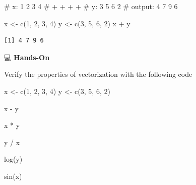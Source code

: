 \documentclass[
  letterpaper,
  DIV=11,
  numbers=noendperiod]{scrreprt}
\newenvironment{Shaded}{\begin{snugshade}}{\end{snugshade}}
\newcommand{\CommentTok}[1]{\textcolor[rgb]{0.37,0.37,0.37}{#1}}
\newcommand{\DecValTok}[1]{\textcolor[rgb]{0.68,0.00,0.00}{#1}}
\newcommand{\FunctionTok}[1]{\textcolor[rgb]{0.28,0.35,0.67}{#1}}
\newcommand{\NormalTok}[1]{\textcolor[rgb]{0.00,0.23,0.31}{#1}}
\newcommand{\OtherTok}[1]{\textcolor[rgb]{0.00,0.23,0.31}{#1}}
\newcommand{\SpecialCharTok}[1]{\textcolor[rgb]{0.37,0.37,0.37}{#1}}
\begin{document}
\begin{Shaded}
\begin{Highlighting}[]
\CommentTok{\#      x:  1  2  3  4}
\CommentTok{\#          +  +  +  +}
\CommentTok{\#      y:  3  5  6  2}
\CommentTok{\# output:  4  7  9  6}

\NormalTok{x }\OtherTok{\textless{}{-}} \FunctionTok{c}\NormalTok{(}\DecValTok{1}\NormalTok{, }\DecValTok{2}\NormalTok{, }\DecValTok{3}\NormalTok{, }\DecValTok{4}\NormalTok{)}
\NormalTok{y }\OtherTok{\textless{}{-}} \FunctionTok{c}\NormalTok{(}\DecValTok{3}\NormalTok{, }\DecValTok{5}\NormalTok{, }\DecValTok{6}\NormalTok{, }\DecValTok{2}\NormalTok{)}
\NormalTok{x }\SpecialCharTok{+}\NormalTok{ y}
\end{Highlighting}
\end{Shaded}

\begin{verbatim}
[1] 4 7 9 6
\end{verbatim}

💻 \textbf{Hands-On}

Verify the properties of vectorization with the following code

\begin{Shaded}
\begin{Highlighting}[]
\NormalTok{x }\OtherTok{\textless{}{-}} \FunctionTok{c}\NormalTok{(}\DecValTok{1}\NormalTok{, }\DecValTok{2}\NormalTok{, }\DecValTok{3}\NormalTok{, }\DecValTok{4}\NormalTok{)}
\NormalTok{y }\OtherTok{\textless{}{-}} \FunctionTok{c}\NormalTok{(}\DecValTok{3}\NormalTok{, }\DecValTok{5}\NormalTok{, }\DecValTok{6}\NormalTok{, }\DecValTok{2}\NormalTok{)}

\NormalTok{x }\SpecialCharTok{{-}}\NormalTok{ y}

\NormalTok{x }\SpecialCharTok{*}\NormalTok{ y}

\NormalTok{y }\SpecialCharTok{/}\NormalTok{ x}

\FunctionTok{log}\NormalTok{(y)}

\FunctionTok{sin}\NormalTok{(x)}
\end{Highlighting}
\end{Shaded}
\end{document}
